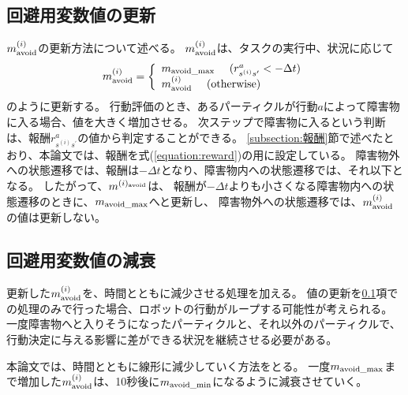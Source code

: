 \subsection{回避用変数値の更新} \label{subsection:回避用変数値の更新}
$m^{(i)}_{\rm avoid}$の更新方法について述べる。
$m^{(i)}_{\rm avoid}$は、タスクの実行中、状況に応じて
\begin{equation}
  m^{(i)}_{\rm avoid} =
  \left\{
    \begin{array}{l}
      m_{\rm avoid\_max} \ \ \ \ (r^{a}_{s^{(i)}s^{\prime}} < - \Delta t) \\
      m^{(i)}_{\rm avoid} \ \ \ \ ({\rm otherwise})
    \end{array}
  \right.
\end{equation}
のように更新する。
行動評価のとき、あるパーティクルが行動$a$によって障害物に入る場合、値を大きく増加させる。
次ステップで障害物に入るという判断は、報酬$r^{a}_{s^{(i)}s^{\prime}}$の値から判定することができる。
\ref{subsection:報酬}節で述べたとおり、本論文では、報酬を式(\ref{equation:reward})の用に設定している。
障害物外への状態遷移では、報酬は$-\Delta t$となり、障害物内への状態遷移では、それ以下となる。
したがって、$m^{(i)_{\rm avoid}}$は、
報酬が$-\Delta t$よりも小さくなる障害物内への状態遷移のときに、$m_{\rm avoid\_max}$へと更新し、
障害物外への状態遷移では、$m^{(i)}_{\rm avoid}$の値は更新しない。

\subsection{回避用変数値の減衰}
更新した$m^{(i)}_{\rm avoid}$を、時間とともに減少させる処理を加える。
値の更新を\ref{subsection:回避用変数値の更新}項での処理のみで行った場合、ロボットの行動がループする可能性が考えられる。
一度障害物へと入りそうになったパーティクルと、それ以外のパーティクルで、行動決定に与える影響に差ができる状況を継続させる必要がある。

本論文では、時間とともに線形に減少していく方法をとる。
一度$m_{\rm avoid\_max}$まで増加した$m^{(i)}_{\rm avoid}$は、10秒後に$m_{\rm avoid\_min}$になるように減衰させていく。
